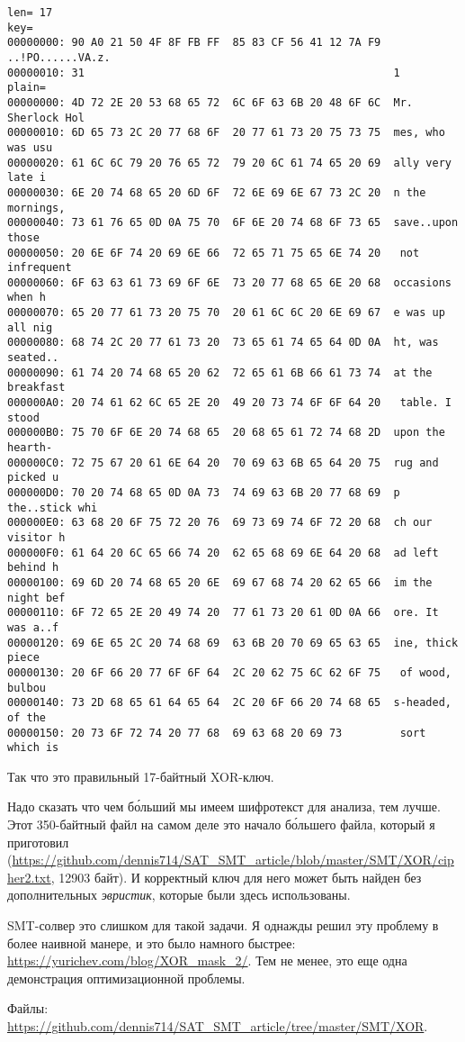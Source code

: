 \begin{lstlisting}
len= 17
key=
00000000: 90 A0 21 50 4F 8F FB FF  85 83 CF 56 41 12 7A F9  ..!PO......VA.z.
00000010: 31                                                1
plain=
00000000: 4D 72 2E 20 53 68 65 72  6C 6F 63 6B 20 48 6F 6C  Mr. Sherlock Hol
00000010: 6D 65 73 2C 20 77 68 6F  20 77 61 73 20 75 73 75  mes, who was usu
00000020: 61 6C 6C 79 20 76 65 72  79 20 6C 61 74 65 20 69  ally very late i
00000030: 6E 20 74 68 65 20 6D 6F  72 6E 69 6E 67 73 2C 20  n the mornings,
00000040: 73 61 76 65 0D 0A 75 70  6F 6E 20 74 68 6F 73 65  save..upon those
00000050: 20 6E 6F 74 20 69 6E 66  72 65 71 75 65 6E 74 20   not infrequent
00000060: 6F 63 63 61 73 69 6F 6E  73 20 77 68 65 6E 20 68  occasions when h
00000070: 65 20 77 61 73 20 75 70  20 61 6C 6C 20 6E 69 67  e was up all nig
00000080: 68 74 2C 20 77 61 73 20  73 65 61 74 65 64 0D 0A  ht, was seated..
00000090: 61 74 20 74 68 65 20 62  72 65 61 6B 66 61 73 74  at the breakfast
000000A0: 20 74 61 62 6C 65 2E 20  49 20 73 74 6F 6F 64 20   table. I stood
000000B0: 75 70 6F 6E 20 74 68 65  20 68 65 61 72 74 68 2D  upon the hearth-
000000C0: 72 75 67 20 61 6E 64 20  70 69 63 6B 65 64 20 75  rug and picked u
000000D0: 70 20 74 68 65 0D 0A 73  74 69 63 6B 20 77 68 69  p the..stick whi
000000E0: 63 68 20 6F 75 72 20 76  69 73 69 74 6F 72 20 68  ch our visitor h
000000F0: 61 64 20 6C 65 66 74 20  62 65 68 69 6E 64 20 68  ad left behind h
00000100: 69 6D 20 74 68 65 20 6E  69 67 68 74 20 62 65 66  im the night bef
00000110: 6F 72 65 2E 20 49 74 20  77 61 73 20 61 0D 0A 66  ore. It was a..f
00000120: 69 6E 65 2C 20 74 68 69  63 6B 20 70 69 65 63 65  ine, thick piece
00000130: 20 6F 66 20 77 6F 6F 64  2C 20 62 75 6C 62 6F 75   of wood, bulbou
00000140: 73 2D 68 65 61 64 65 64  2C 20 6F 66 20 74 68 65  s-headed, of the
00000150: 20 73 6F 72 74 20 77 68  69 63 68 20 69 73         sort which is
\end{lstlisting}

Так что это правильный 17-байтный XOR-ключ.

Надо сказать что чем б\'{о}льший мы имеем шифротекст для анализа, тем лучше.
Этот 350-байтный файл на самом деле это начало б\'{о}льшего файла, который я приготовил
(\url{https://github.com/dennis714/SAT_SMT_article/blob/master/SMT/XOR/cipher2.txt}, 12903 байт).
И корректный ключ для него может быть найден без дополнительных \textit{эвристик}, которые были здесь использованы.

SMT-солвер это слишком для такой задачи. Я однажды решил эту проблему в более наивной манере, и это было намного быстрее:
\url{https://yurichev.com/blog/XOR_mask_2/}.
Тем не менее, это еще одна демонстрация оптимизационной проблемы.

Файлы: \url{https://github.com/dennis714/SAT_SMT_article/tree/master/SMT/XOR}.

